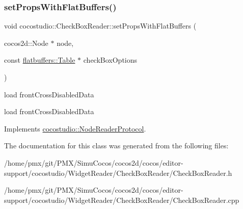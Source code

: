 \subsubsection{\texorpdfstring{set\+Props\+With\+Flat\+Buffers()}{setPropsWithFlatBuffers()}}
{\footnotesize\ttfamily void cocostudio\+::\+Check\+Box\+Reader\+::set\+Props\+With\+Flat\+Buffers (\begin{DoxyParamCaption}\item[{cocos2d\+::\+Node $\ast$}]{node,  }\item[{const \hyperlink{classflatbuffers_1_1Table}{flatbuffers\+::\+Table} $\ast$}]{check\+Box\+Options }\end{DoxyParamCaption})\hspace{0.3cm}{\ttfamily [virtual]}}

load front\+Cross\+Disabled\+Data

load front\+Cross\+Disabled\+Data 

Implements \hyperlink{classcocostudio_1_1NodeReaderProtocol}{cocostudio\+::\+Node\+Reader\+Protocol}.



The documentation for this class was generated from the following files\+:\begin{DoxyCompactItemize}
\item 
/home/pmx/git/\+P\+M\+X/\+Simu\+Cocos/cocos2d/cocos/editor-\/support/cocostudio/\+Widget\+Reader/\+Check\+Box\+Reader/Check\+Box\+Reader.\+h\item 
/home/pmx/git/\+P\+M\+X/\+Simu\+Cocos/cocos2d/cocos/editor-\/support/cocostudio/\+Widget\+Reader/\+Check\+Box\+Reader/Check\+Box\+Reader.\+cpp\end{DoxyCompactItemize}
